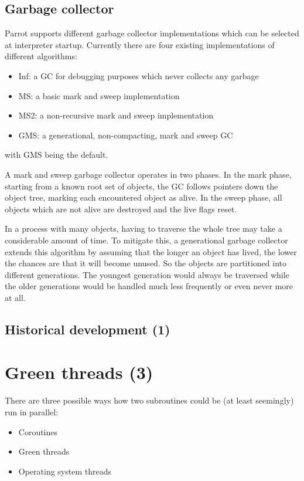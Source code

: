 \documentclass[bachelor,english]{hgbthesis}
\begin{document}
\section{Garbage collector}

Parrot supports different garbage collector implementations which can be selected at interpreter startup. Currently there are four existing implementations of different algorithms:
\begin{itemize}
\item Inf: a GC for debugging purposes which never collects any garbage
\item MS: a basic mark and sweep implementation
\item MS2: a non-recursive mark and sweep implementation
\item GMS: a generational, non-compacting, mark and sweep GC
\end{itemize}
with GMS being the default.

A mark and sweep garbage collector operates in two phases. In the mark phase, starting from a known root set of objects, the GC follows pointers down the object tree, marking each encountered object as alive. In the sweep phase, all objects which are not alive are destroyed and the live flags reset.

In a process with many objects, having to traverse the whole tree may take a considerable amount of time. To mitigate this, a generational garbage collector extends this algorithm by assuming that the longer an object has lived, the lower the chances are that it will become unused. So the objects are partitioned into different generations. The youngest generation would always be traversed while the older generations would be handled much less frequently or even never more at all.

\section{Historical development (1)}

\chapter{Green threads (3)}

There are three possible ways how two subroutines could be (at least seemingly) run in parallel:
\begin{itemize}
\item Coroutines
\item Green threads 
\item Operating system threads
\end{itemize}
\end{document}
